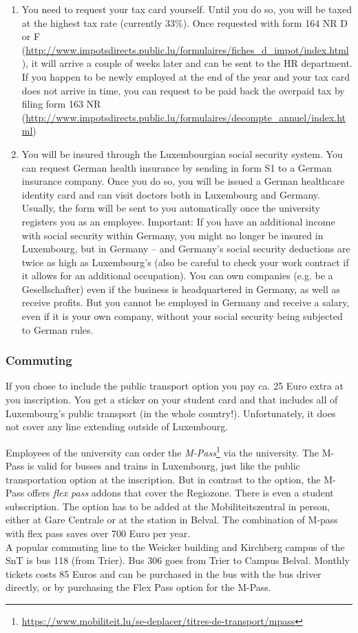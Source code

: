 \begin{enumerate}
\item You need to request your tax card yourself. Until you do so, you will be taxed at the highest tax rate (currently 33\%). Once requested with form 164 NR D or F (\url{http://www.impotsdirects.public.lu/formulaires/fiches_d_impot/index.html}), it will arrive a couple of weeks later and can be sent to the HR department. If you happen to be newly employed at the end of the year and your tax card does not arrive in time, you can request to be paid back the overpaid tax by filing form 163 NR (\url{http://www.impotsdirects.public.lu/formulaires/decompte_annuel/index.html})
\item You will be insured through the Luxembourgian social security system. You can request German health insurance by sending in form S1 to a German insurance company. Once you do so, you will be issued a German healthcare identity card and can visit doctors both in Luxembourg and Germany. Usually, the form will be sent to you automatically once the university registers you as an employee.
Important: If you have an additional income with social security within Germany, you might no longer be insured in Luxembourg, but in Germany – and Germany's social security deductions are twice as high as Luxembourg’s (also be careful to check your work contract if it allows for an additional occupation).
You can own companies (e.g. be a Gesellschafter) even if the business is headquartered in Germany, as well as receive profits. But you cannot be employed in Germany and receive a salary, even if it is your own company, without your social security being subjected to German rules.
\end{enumerate}

\subsubsection{Commuting}
If you chose to include the public transport option you pay ca. 25 Euro extra at you inscription.
 You get a sticker on your student card and that includes all of Luxembourg's public transport (in the whole country!).
 Unfortunately, it does not cover any line extending outside of Luxembourg.

Employees of the university can order the \emph{M-Pass}\footnote{\url{https://www.mobiliteit.lu/se-deplacer/titres-de-transport/mpass}} via the university.
The M-Pass is valid for busses and trains in Luxembourg, just like the public transportation option at the inscription. But in contrast to the option, the M-Pass
offers \emph{flex pass} addons that cover the Regiozone. There is even a student subscription. The option has to be added at the Mobiliteitszentral in person, either
at Gare Centrale or at the station in Belval. The combination of M-pass with flex pass saves over 700 Euro per year.\\

A popular commuting line to the Weicker building and Kirchberg campus of the SnT is bus 118 (from Trier). Bus 306 goes from Trier to Campus Belval.
Monthly tickets costs 85 Euros and can be purchased in the bus with the bus driver directly, or by purchasing the Flex Pass option for the M-Pass.
